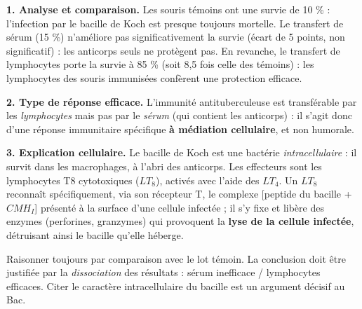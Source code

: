 \documentclass[11pt]{article}
\newcommand{\cle}[1]{{\popxbold\color{popdark}#1}}
\begin{document}
\begin{corrige}

\textbf{1. Analyse et comparaison.} Les souris témoins ont une survie de 10 \% : l'infection par le bacille de Koch est presque toujours mortelle. Le transfert de sérum (15 \%) n'améliore pas significativement la survie (écart de 5 points, non significatif) : les anticorps seuls ne protègent pas. En revanche, le transfert de lymphocytes porte la survie à 85 \% (soit 8,5 fois celle des témoins) : les lymphocytes des souris immunisées confèrent une protection efficace.

\textbf{2. Type de réponse efficace.} L'immunité antituberculeuse est transférable par les \emph{lymphocytes} mais pas par le \emph{sérum} (qui contient les anticorps) : il s'agit donc d'une réponse immunitaire spécifique \textbf{à médiation cellulaire}, et non humorale.

\textbf{3. Explication cellulaire.} Le bacille de Koch est une bactérie \emph{intracellulaire} : il survit dans les macrophages, à l'abri des anticorps. Les effecteurs sont les \cle{lymphocytes T8 cytotoxiques} ($LT_8$), activés avec l'aide des $LT_4$. Un $LT_8$ reconnaît spécifiquement, via son récepteur T, le complexe [peptide du bacille + $CMH_I$] présenté à la surface d'une cellule infectée ; il s'y fixe et libère des enzymes (perforines, granzymes) qui provoquent la \textbf{lyse de la cellule infectée}, détruisant ainsi le bacille qu'elle héberge.
\end{corrige}

\begin{attention}
Raisonner toujours par comparaison avec le lot témoin. La conclusion doit être justifiée par la \emph{dissociation} des résultats : sérum inefficace / lymphocytes efficaces. Citer le caractère intracellulaire du bacille est un argument décisif au Bac.
\end{attention}
\end{document}
